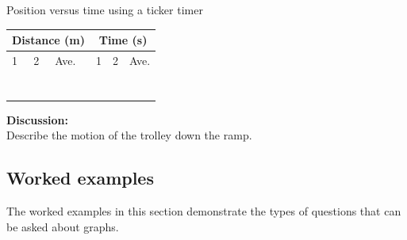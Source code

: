 \begin{f_experiment}{Position versus time using a ticker timer}
        \par 
          \begin{table}[H]
        \begin{center}
      \label{m38795*id7141349}
      \begin{tabular}{|l|l|l|l|l|l|}\hline
    \multicolumn{3}{|c|}{Distance (m)}
     &
    \multicolumn{3}{c|}{Time (s)}
     \\ \hline
        1 &
        2 &
        Ave. &
        1 &
        2 &
        Ave. \\ \hline
         &
         &
         &
         &
         &
      \\ \hline
         &
         &
         &
         &
         &
       \\ \hline
         &
         &
         &
         &
         &
       \\ \hline
         &
         &
         &
         &
         &
        \\ \hline
         &
         &
         &
         &
         &
        \\ \hline
         &
         &
         &
         &
         &
       \\ \hline
         &
         &
         &
         &
         &
      \\ \hline
    \end{tabular}
      \end{center}
\end{table}
    \par
        \label{m38795*id7172254}\noindent{}\textbf{Discussion:}\\
Describe the motion of the trolley down the ramp. 
\end{f_experiment}
\par \label{m38795*cid9}
\clearpage            
\subsection*{Worked examples}
            \nopagebreak
      \label{m38795*id73306}The worked examples in this section demonstrate the types of questions that can be asked about graphs.

